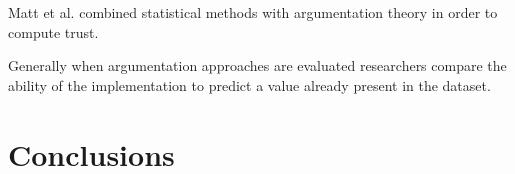 Matt et al.\cite{matt2010combining} combined statistical methods with argumentation theory in order to compute trust.

Generally when argumentation approaches are evaluated researchers compare the ability of the implementation to predict a value already present in the dataset. 


\section{Conclusions}
